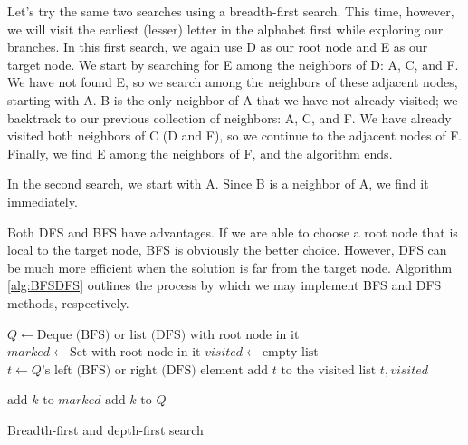 Let's try the same two searches using a breadth-first search. This time, however,
we will visit the earliest (lesser) letter in the alphabet first while
exploring our branches. In this first search, we again use D as our root node and
E as our target node.
We start by searching for E among the neighbors of D: A, C, and F.
We have not found E, so we search among the neighbors of these adjacent nodes, starting with A.
B is the only neighbor of A that we have not already visited; we backtrack to our previous collection of neighbors: A, C, and F.
We have already visited both neighbors of C (D and F), so we continue to the adjacent nodes of F. Finally, we find E among the neighbors of F, and the algorithm ends.

In the second search, we start with A.
Since B is a neighbor of A, we find it immediately.

Both DFS and BFS have advantages.
If we are able to choose a root node that is local to the target node, BFS is obviously the better choice. However,
DFS can be much more efficient when the solution is far from the target node.
Algorithm \ref{alg:BFSDFS} outlines the process by which we may implement BFS and DFS methods, respectively.

\begin{algorithm}
\begin{algorithmic}[1]
	\State $Q \gets \text{Deque (BFS) or list (DFS) with root node in it}$	
	\State $marked \gets \text{Set with root node in it}$	
	\State $visited \gets \text{empty list}$	
							
		\State $t \gets Q\text{'s left (BFS) or right (DFS) element}$	
		\State $\text{add }t \text{ to the visited list}$
									
			\State {} $t,visited$
		
		\Else										{}
					\State $\text{add } k \text{ to } marked$
					\State $\text{add } k \text{ to } Q$
				\EndIf
			\EndFor
		\EndIf
	\EndWhile
\EndProcedure
\end{algorithmic}
\caption{Breadth-first and depth-first search}
\label{alg:BFSDFS}
\end{algorithm}

